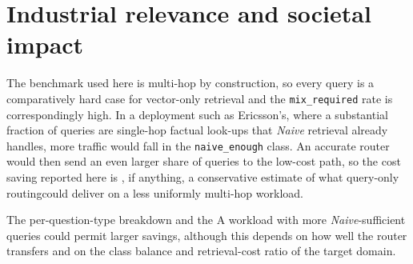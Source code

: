 \documentclass[english, bibtex]{kththesis}               %
\numberwithin{listing}{chapter}
\providecommand{\DIFaddtex}[1]{{\protect\color{blue} \sf #1}} %
\providecommand{\DIFdeltex}[1]{{\protect\color{red} \scriptsize #1}} %
\providecommand{\DIFaddbegin}{} %
\providecommand{\DIFaddend}{} %
\providecommand{\DIFdelbegin}{} %
\providecommand{\DIFdelend}{} %
\providecommand{\DIFadd}[1]{\texorpdfstring{\DIFaddtex{#1}}{#1}} %
\providecommand{\DIFdel}[1]{\texorpdfstring{\DIFdeltex{#1}}{}} %
\begin{document}
\section{Industrial relevance and societal impact}
\label{sec:discIndustrial}

\DIFaddend The benchmark used here is multi-hop by construction, so every query is a comparatively hard case for vector-only retrieval and the \texttt{mix\_required} rate is correspondingly high. In a deployment such as Ericsson's, where a substantial fraction of queries are single-hop factual look-ups that \emph{Naive} retrieval already handles, more traffic would fall in the \texttt{naive\_enough} class. \DIFdelbegin \DIFdel{An accurate router would then send an even larger share of queries to the low-cost path, so the cost saving reported here is , if anything, a conservative estimate of what query-only routingcould deliver on a less uniformly multi-hop workload. }%

\DIFdel{The per-question-type breakdown and the }\DIFdelend \DIFaddbegin \DIFadd{A workload with more \emph{Naive}-sufficient queries could permit larger savings, although this depends on how well the router transfers and on the class balance and retrieval-cost ratio of the target domain.
}
\end{document}
